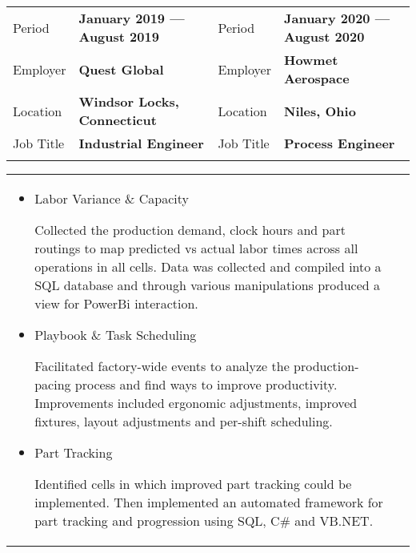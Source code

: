 \documentclass[a4paper, oneside, final, 10pt]{scrartcl} %
\newcommand{\gray}{\rowcolor[gray]{.90}} %
\newcommand{\Csharp}{C{\lserif\#}}
\begin{document}
\begin{center}
\begin{tabularx}{0.97\linewidth}{XX|XX}
    \gray{}Period    & \textbf{January 2019 --- August 2019} & Period & \textbf{January 2020 --- August 2020}\\
    \gray{}Employer  & \textbf{Quest Global}                 & Employer & \textbf{Howmet Aerospace} \\
    \gray{}Location  & \textbf{Windsor Locks, Connecticut}   & Location & \textbf{Niles, Ohio}\\
    \gray{}Job Title & \textbf{Industrial Engineer}          & Job Title & \textbf{Process Engineer}\\
    \vspace{-10pt}
\end{tabularx}

\vspace{-10pt}
\begin{tabularx}{0.97\linewidth}{X|X}
    \vspace{-10pt}
    \begin{itemize}\setlength\itemsep{0em}
        \item{Labor Variance \&{} Capacity}
        \begin{sloppypar}
            Collected the production demand, clock hours and part routings to map predicted vs actual labor times across all operations in all cells.
            Data was collected and compiled into a SQL database and through various manipulations produced a view for PowerBi interaction.
        \end{sloppypar}
        \item{Playbook \&{} Task Scheduling}
        \begin{sloppypar}
            Facilitated factory-wide events to analyze the production-pacing process and find ways to improve productivity.
            Improvements included ergonomic adjustments, improved fixtures, layout adjustments and per-shift scheduling.
        \end{sloppypar}
        \item{Part Tracking}
        \begin{sloppypar}
            Identified cells in which improved part tracking could be implemented.
            Then implemented an automated framework for part tracking and progression using SQL, \Csharp{} and VB.NET.
        \end{sloppypar}
    \end{itemize} & \vspace{-10pt} \begin{itemize}\setlength\itemsep{0em}

\end{itemize}
\end{tabularx}
\end{center}
\end{document}
